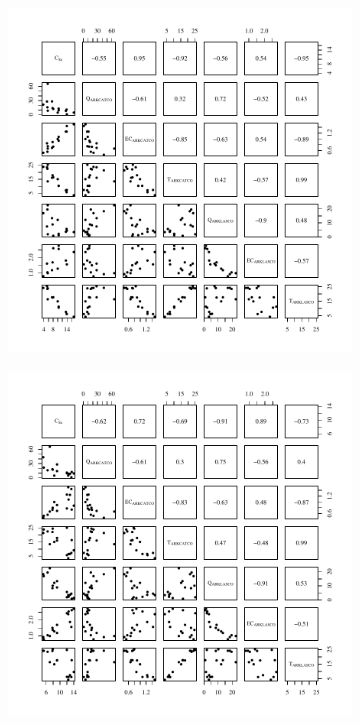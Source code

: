 \subfiguretop
\begin{landscape}
	\begin{figure}
		\begin{subfigure}{0.7\textwidth}
			\centering
			\includegraphics[width=\tableCustomSize]{"Figures/Results_USR/Stochastic/Conc Model Full PairsU163"}
		\end{subfigure}%
		\begin{subfigure}{0.7\textwidth}
			\centering
			\includegraphics[width=\tableCustomSize]{"Figures/Results_USR/Stochastic/Conc Model Full PairsU201"}

\end{subfigure}
\end{figure}
\end{landscape}
